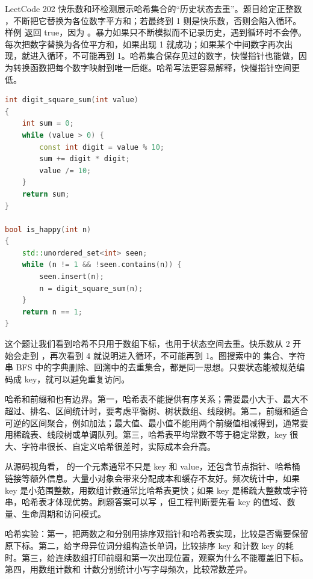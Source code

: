 LeetCode 202 快乐数和环检测展示哈希集合的“历史状态去重”。题目给定正整数 ，不断把它替换为各位数字平方和；若最终到 1 则是快乐数，否则会陷入循环。样例  返回 true，因为 。暴力如果只不断模拟而不记录历史，遇到循环时不会停。每次把数字替换为各位平方和，如果出现 1 就成功；如果某个中间数字再次出现，就进入循环，不可能再到 1。哈希集合保存见过的数字，快慢指针也能做，因为转换函数把每个数字映射到唯一后继。哈希写法更容易解释，快慢指针空间更低。

\begin{lstlisting}[language=C++,caption={LeetCode 202 快乐数：哈希集合检测循环}]
int digit_square_sum(int value)
{
    int sum = 0;
    while (value > 0) {
        const int digit = value % 10;
        sum += digit * digit;
        value /= 10;
    }
    return sum;
}

bool is_happy(int n)
{
    std::unordered_set<int> seen;
    while (n != 1 && !seen.contains(n)) {
        seen.insert(n);
        n = digit_square_sum(n);
    }
    return n == 1;
}
\end{lstlisting}

这个题让我们看到哈希不只用于数组下标，也用于状态空间去重。快乐数从 2 开始会走到 ，再次看到 4 就说明进入循环，不可能再到 1。图搜索中的  集合、字符串 BFS 中的字典删除、回溯中的去重集合，都是同一思想。只要状态能被规范编码成 key，就可以避免重复访问。

哈希和前缀和也有边界。第一，哈希表不能提供有序关系；需要最小大于、最大不超过、排名、区间统计时，要考虑平衡树、树状数组、线段树。第二，前缀和适合可逆的区间聚合，例如加法；最大值、最小值不能用两个前缀值相减得到，通常要用稀疏表、线段树或单调队列。第三，哈希表平均常数不等于稳定常数，key 很大、字符串很长、自定义哈希很差时，实际成本会升高。

\begin{deepdive}
从源码视角看， 的一个元素通常不只是 key 和 value，还包含节点指针、哈希桶链接等额外信息。大量小对象会带来分配成本和缓存不友好。频次统计中，如果 key 是小范围整数，用数组计数通常比哈希表更快；如果 key 是稀疏大整数或字符串，哈希表才体现优势。刷题答案可以写 ，但工程判断要先看 key 的值域、数量、生命周期和访问模式。
\end{deepdive}

\begin{labbox}
哈希实验：第一，把两数之和分别用排序双指针和哈希表实现，比较是否需要保留原下标。第二，给字母异位词分组构造长单词，比较排序 key 和计数 key 的耗时。第三，给连续数组打印前缀和第一次出现位置，观察为什么不能覆盖旧下标。第四，用数组计数和  计数分别统计小写字母频次，比较常数差异。
\end{labbox}

